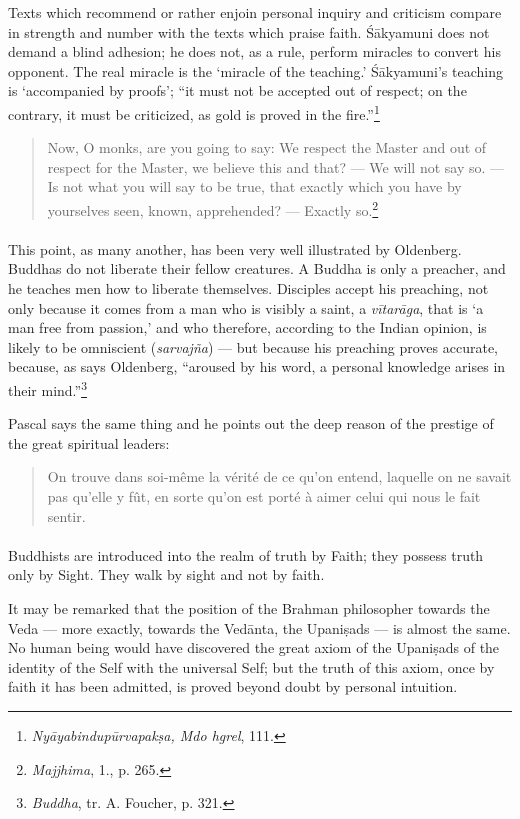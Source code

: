 \documentclass[a4paper, 11pt, oneside, english, landscape]{article}
\begin{document}
Texts which recommend or rather enjoin personal inquiry and criticism compare in strength and number with the texts which praise faith. Śākyamuni does not demand a blind adhesion; he does not, as a rule, perform miracles to convert his opponent. The real miracle is the `miracle of the teaching.' Śākyamuni's teaching is `accompanied by proofs'; ``it must not be accepted out of respect; on the contrary, it must be criticized, as gold is proved in the fire.''\footnote{\emph{Nyāyabindupūrvapakṣa, Mdo hgrel}, 111.}
\begin{quotation}
\small
Now, O monks, are you going to say: We respect the Master and out of respect for the Master, we believe this and that? --- We will not say so. --- Is not what you will say to be true, that exactly which you have by yourselves seen, known, apprehended? --- Exactly so.\footnote{\emph{Majjhima}, 1., p. 265.}
\end{quotation}
\paragraph{}
This point, as many another, has been very well illustrated by Oldenberg. Buddhas do not liberate their fellow creatures. A Buddha is only a preacher, and he teaches men how to liberate themselves. Disciples accept his preaching, not only because it comes from a man who is visibly a saint, a \emph{vītarāga}, that is `a man free from passion,' and who therefore, according to the Indian opinion, is likely to be omniscient (\emph{sarvajña}) --- but because his preaching proves accurate, because, as says Oldenberg, ``aroused by his word, a personal knowledge arises in their mind.''\footnote{\emph{Buddha}, tr. A. Foucher, p. 321.}

Pascal says the same thing and he points out the deep reason of the prestige of the great spiritual leaders:
\begin{quotation}
\small
On trouve dans soi-même la vérité de ce qu'on entend, laquelle on ne savait pas qu'elle y fût, en sorte qu'on est porté à aimer celui qui nous le fait sentir.
\end{quotation}
\paragraph{}
Buddhists are introduced into the realm of truth by Faith; they possess truth only by Sight. They walk by sight and not by faith.

It may be remarked that the position of the Brahman philosopher towards the Veda --- more exactly, towards the Vedānta, the Upaniṣads --- is almost the same. No human being would have discovered the great axiom of the Upaniṣads of the identity of the Self with the universal Self; but the truth of this axiom, once by faith it has been admitted, is proved beyond doubt by personal intuition.
\end{document}
